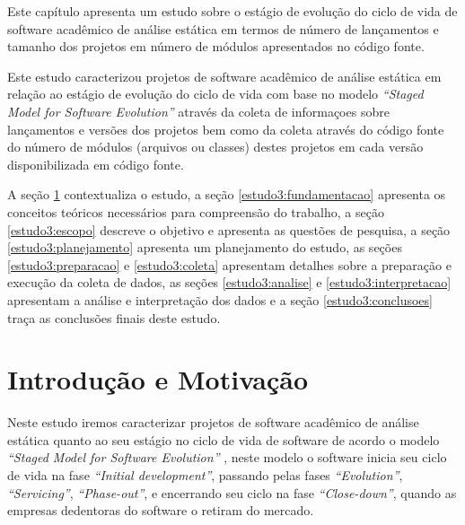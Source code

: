 {Este capítulo apresenta um estudo sobre o estágio de evolução do ciclo de vida
de software acadêmico de análise estática em termos de número de lançamentos e
tamanho dos projetos em número de módulos apresentados no código fonte.}
\label{estudo3}



Este estudo caracterizou projetos de software acadêmico de análise estática em
relação ao estágio de evolução do ciclo de vida com base no modelo {\it
``Staged Model for Software Evolution''} através da coleta de informaçoes sobre
lançamentos e versões dos projetos bem como da coleta através do código fonte
do número de módulos (arquivos ou classes) destes projetos em cada versão
disponibilizada em código fonte.

A seção \ref{estudo3:introducao} contextualiza o estudo,
a seção \ref{estudo3:fundamentacao} apresenta os conceitos teóricos necessários para compreensão do trabalho,
a seção \ref{estudo3:escopo} descreve o objetivo e apresenta as questões de pesquisa,
a seção \ref{estudo3:planejamento} apresenta um planejamento do estudo,
as seções \ref{estudo3:preparacao} e \ref{estudo3:coleta} apresentam detalhes sobre a preparação e execução da coleta de dados,
as seções \ref{estudo3:analise} e \ref{estudo3:interpretacao} apresentam a análise e interpretação dos dados e
a seção \ref{estudo3:conclusoes} traça as conclusões finais deste estudo.

\section{Introdução e Motivação} \label{estudo3:introducao}

Neste estudo iremos caracterizar projetos de software acadêmico de análise
estática quanto ao seu estágio no ciclo de vida de software de acordo o modelo
{\it ``Staged Model for Software Evolution''}
\cite{rajlich2000staged}, neste modelo o software inicia seu ciclo de
vida na fase {\it ``Initial development''}, passando pelas fases {\it
``Evolution''}, {\it ``Servicing''}, {\it ``Phase-out''}, e encerrando seu ciclo
na fase {\it ``Close-down''}, quando as empresas dedentoras do
software o retiram do mercado.

